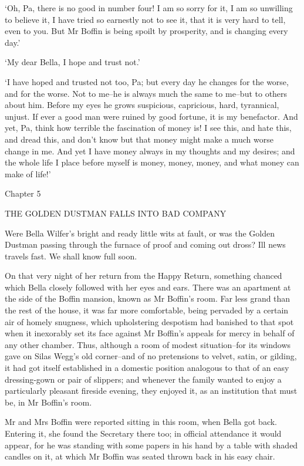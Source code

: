 ‘Oh, Pa, there is no good in number four! I am so sorry for it, I am so
unwilling to believe it, I have tried so earnestly not to see it, that
it is very hard to tell, even to you. But Mr Boffin is being spoilt by
prosperity, and is changing every day.’

‘My dear Bella, I hope and trust not.’

‘I have hoped and trusted not too, Pa; but every day he changes for
the worse, and for the worse. Not to me--he is always much the same
to me--but to others about him. Before my eyes he grows suspicious,
capricious, hard, tyrannical, unjust. If ever a good man were ruined by
good fortune, it is my benefactor. And yet, Pa, think how terrible the
fascination of money is! I see this, and hate this, and dread this, and
don’t know but that money might make a much worse change in me. And yet
I have money always in my thoughts and my desires; and the whole life I
place before myself is money, money, money, and what money can make of
life!’



Chapter 5

THE GOLDEN DUSTMAN FALLS INTO BAD COMPANY


Were Bella Wilfer’s bright and ready little wits at fault, or was the
Golden Dustman passing through the furnace of proof and coming out
dross? Ill news travels fast. We shall know full soon.

On that very night of her return from the Happy Return, something
chanced which Bella closely followed with her eyes and ears. There was
an apartment at the side of the Boffin mansion, known as Mr Boffin’s
room. Far less grand than the rest of the house, it was far more
comfortable, being pervaded by a certain air of homely snugness, which
upholstering despotism had banished to that spot when it inexorably set
its face against Mr Boffin’s appeals for mercy in behalf of any other
chamber. Thus, although a room of modest situation--for its windows gave
on Silas Wegg’s old corner--and of no pretensions to velvet, satin, or
gilding, it had got itself established in a domestic position analogous
to that of an easy dressing-gown or pair of slippers; and whenever the
family wanted to enjoy a particularly pleasant fireside evening, they
enjoyed it, as an institution that must be, in Mr Boffin’s room.

Mr and Mrs Boffin were reported sitting in this room, when Bella got
back. Entering it, she found the Secretary there too; in official
attendance it would appear, for he was standing with some papers in his
hand by a table with shaded candles on it, at which Mr Boffin was seated
thrown back in his easy chair.

